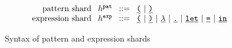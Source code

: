 \begin{figure}
  \[\arraycolsep=4pt\begin{array}{rlrl}
    \text{pattern shard} & \shard^{\pat} & ::= &
      \shardlit{\texttt{(}} ~\vert~
      \shardlit{\texttt{)}} \\
    \text{expression shard} & \shard^{\expr} & ::= &
      \shardlit{\texttt{(}} ~\vert~
      \shardlit{\texttt{)}} ~\vert~
      \shardlit{$\lambda$} ~\vert~
      \shardlit{\texttt{.}} ~\vert~
      \shardlit{\texttt{let}} ~\vert~
      \shardlit{\texttt{=}} ~\vert~
      \shardlit{\texttt{in}}
  \end{array}\]
  \caption{Syntax of pattern and expression shards}
  \label{fig:shard-syntax-2}
\end{figure}

